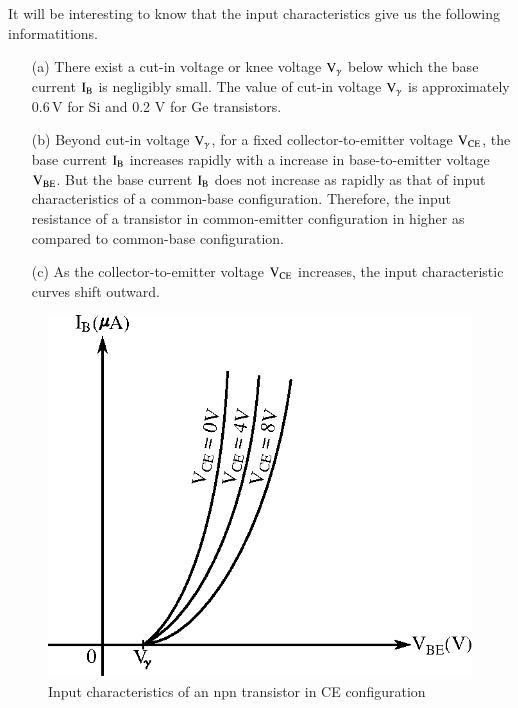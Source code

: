 It will be interesting to know that the input characteristics give us the following informatitions.
\begin{itemize}
\itemsep=0pt
\item[(a)] There exist a cut-in voltage or knee voltage $\textrm{V}_{\gamma}$ below which the base current $\textrm{I}_{\textrm{B}}$ is negligibly small. The value of cut-in voltage $\textrm{V}_{\gamma}$ is approximately 0.6\,V for Si and 0.2 V for Ge transistors.

\item[(b)] Beyond cut-in voltage $\textrm{V}_{\gamma}$, for a fixed collector-to-emitter voltage $\textrm{V}_{\text{CE}}$, the base current $\textrm{I}_{\textrm{B}}$ increases rapidly with a increase in base-to-emitter voltage $\textrm{V}_{\text{BE}}$. But the base current $\textrm{I}_{\textrm{B}}$ does not increase as rapidly as that of input characteristics of a common-base configuration. Therefore, the input resistance of a transistor in common-emitter configuration in higher as compared to common-base configuration.

\item[(c)] As the collector-to-emitter voltage $\textrm{V}_{\text{CE}}$ increases, the input characteristic curves shift outward.
\end{itemize}
\begin{figure}[H]
\centering
\includegraphics{chap2/fig15.eps}

\smallskip
\caption{Input characteristics of an npn transistor in CE configuration}\label{fig2.15}
\end{figure}

